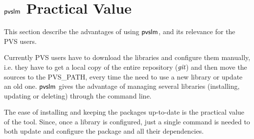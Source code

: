 \section{$\textsf{pvslm}$ Practical Value}
\label{sec.pvslm}

This section describe the advantages of using $\textsf{pvslm}$, 
and its relevance for the PVS users.

Currently PVS users have to download the libraries 
and configure them manually, i.e. they have to get a local 
copy of the entire repository ($\textit{git}$) and then move the 
sources to the PVS\_PATH, every time the need to use 
a new library or update an old one. $\textsf{pvslm}$ gives the 
advantage of managing several libraries (installing, 
updating or deleting) through the command line. 

The ease of installing and keeping the packages up-to-date 
is the practical value of the tool. Since, once a library is 
configured, just a single command is needed to both update
and configure the package and all their dependencies.